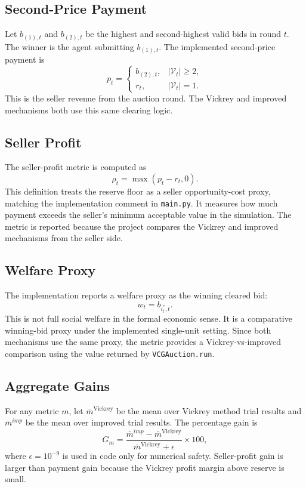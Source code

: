 \documentclass[conference]{IEEEtran}
\begin{document}
\subsection{Second-Price Payment}
Let $b_{(1),t}$ and $b_{(2),t}$ be the highest and second-highest valid bids in round $t$. The winner is the agent submitting $b_{(1),t}$. The implemented second-price payment is
\begin{equation}
p_t =
\begin{cases}
b_{(2),t}, & |\mathcal{V}_t| \geq 2,\\
r_t, & |\mathcal{V}_t| = 1.
\end{cases}
\label{eq:payment}
\end{equation}
This is the seller revenue from the auction round. The Vickrey and improved mechanisms both use this same clearing logic.

\subsection{Seller Profit}
The seller-profit metric is computed as
\begin{equation}
\rho_t = \max(p_t - r_t, 0).
\label{eq:profit}
\end{equation}
This definition treats the reserve floor as a seller opportunity-cost proxy, matching the implementation comment in \texttt{main.py}. It measures how much payment exceeds the seller's minimum acceptable value in the simulation. The metric is reported because the project compares the Vickrey and improved mechanisms from the seller side.

\subsection{Welfare Proxy}
The implementation reports a welfare proxy as the winning cleared bid:
\begin{equation}
w_t = b_{i_t^\ast,t}.
\end{equation}
This is not full social welfare in the formal economic sense. It is a comparative winning-bid proxy under the implemented single-unit setting. Since both mechanisms use the same proxy, the metric provides a Vickrey-vs-improved comparison using the value returned by \texttt{VCGAuction.run}.

\subsection{Aggregate Gains}
For any metric $m$, let $\bar{m}^{\mathrm{Vickrey}}$ be the mean over Vickrey method trial results and $\bar{m}^{imp}$ be the mean over improved trial results. The percentage gain is
\begin{equation}
G_m = \frac{\bar{m}^{imp} - \bar{m}^{\mathrm{Vickrey}}}{\bar{m}^{\mathrm{Vickrey}} + \epsilon} \times 100,
\end{equation}
where $\epsilon=10^{-9}$ is used in code only for numerical safety. Seller-profit gain is larger than payment gain because the Vickrey profit margin above reserve is small.
\end{document}
